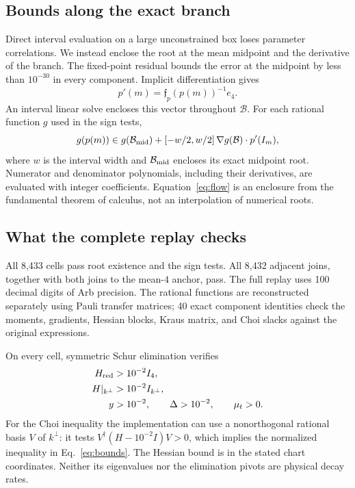 \documentclass[aps,pra,reprint,amsmath,amssymb,longbibliography]{revtex4-2}
\begin{document}
\subsection{Bounds along the exact branch}
Direct interval evaluation on a large unconstrained box loses parameter correlations. We instead enclose the root at the mean midpoint and the derivative of the branch. The fixed-point residual bounds the error at the midpoint by less than $10^{-30}$ in every component. Implicit differentiation gives
\begin{equation}
 p'(m)=\mathfrak f_p(p(m))^{-1}e_4.\label{eq:velocity}
\end{equation}
An interval linear solve encloses this vector throughout $\mathcal B$. For each rational function $g$ used in the sign tests,
\begin{equation}
 g(p(m))\in g(\mathcal B_{\rm mid})+
 [-w/2,w/2]\,\nabla g(\mathcal B)\cdot p'(I_m),\label{eq:flow}
\end{equation}
where $w$ is the interval width and $\mathcal B_{\rm mid}$ encloses its exact midpoint root. Numerator and denominator polynomials, including their derivatives, are evaluated with integer coefficients. Equation~\eqref{eq:flow} is an enclosure from the fundamental theorem of calculus, not an interpolation of numerical roots.

\subsection{What the complete replay checks}
All 8,433 cells pass root existence and the sign tests. All 8,432 adjacent joins, together with both joins to the mean-$4$ anchor, pass. The full replay uses 100 decimal digits of Arb precision. The rational functions are reconstructed separately using Pauli transfer matrices; 40 exact component identities check the moments, gradients, Hessian blocks, Kraus matrix, and Choi slacks against the original expressions.

On every cell, symmetric Schur elimination verifies
\begin{align}
 H_{\rm red}&>10^{-2}I_4,\nonumber\\
 H|_{k^\perp}&>10^{-2}I_{k^\perp},\label{eq:bounds}\\
 y&>10^{-2},\qquad \Delta>10^{-2},\qquad \mu_t>0.\nonumber
\end{align}
For the Choi inequality the implementation can use a nonorthogonal rational basis $V$ of $k^\perp$: it tests $V^\dagger(H-10^{-2}I)V>0$, which implies the normalized inequality in Eq.~\eqref{eq:bounds}. The Hessian bound is in the stated chart coordinates. Neither its eigenvalues nor the elimination pivots are physical decay rates.
\end{document}
